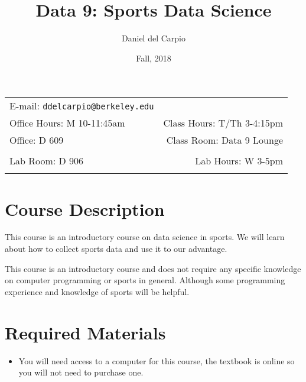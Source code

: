\documentclass[11pt]{article}
\title{Data 9: Sports Data Science}
\author{Daniel del Carpio}
\date{Fall, 2018}
\newcommand{\blankline}{\quad\pagebreak[2]}
\begin{document}
\maketitle

\blankline

\begin{tabular*}{.93\textwidth}{@{\extracolsep{\fill}}lr}


E-mail: \texttt{ddelcarpio@berkeley.edu} \\

 Office Hours: M 10-11:45am  &  Class Hours: T/Th 3-4:15pm \\

 Office: D 609 & Class Room: Data 9 Lounge \\
 & \\
Lab Room: D 906 & Lab Hours: W 3-5pm \\
&  \\
\hline
\end{tabular*}

\vspace{5 mm}


\section*{Course Description}

This course is an introductory course on data science in sports. We will learn about how to collect sports data and use it to our advantage.

\bigskip

\noindent This course is an introductory course and does not require any specific knowledge on computer programming or sports in general. Although some programming experience and knowledge of sports will be helpful. 


\section*{Required Materials}

\begin{itemize}
\item You will need access to a computer for this course, the textbook is online so you will not need to purchase one. 
\end{itemize}
\end{document}
